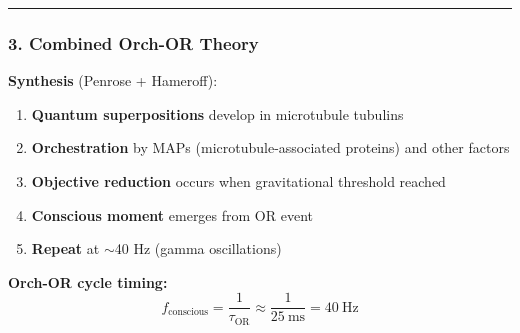 \begin{center}\rule{0.5\linewidth}{0.5pt}\end{center}

\subsubsection{3. Combined Orch-OR Theory}\label{combined-orch-or-theory}

\textbf{Synthesis} (Penrose + Hameroff):

\begin{enumerate}
\def\labelenumi{\arabic{enumi}.}
\tightlist
\item \textbf{Quantum superpositions} develop in microtubule tubulins
\item \textbf{Orchestration} by MAPs (microtubule-associated proteins) and other factors
\item \textbf{Objective reduction} occurs when gravitational threshold reached
\item \textbf{Conscious moment} emerges from OR event
\item \textbf{Repeat} at $\sim$40 Hz (gamma oscillations)
\end{enumerate}

\textbf{Orch-OR cycle timing:}
\begin{equation}
\label{eq:orch-or-frequency}
f_{\text{conscious}} = \frac{1}{\tau_{\text{OR}}} \approx \frac{1}{25~\text{ms}} = 40~\text{Hz}
\end{equation}

